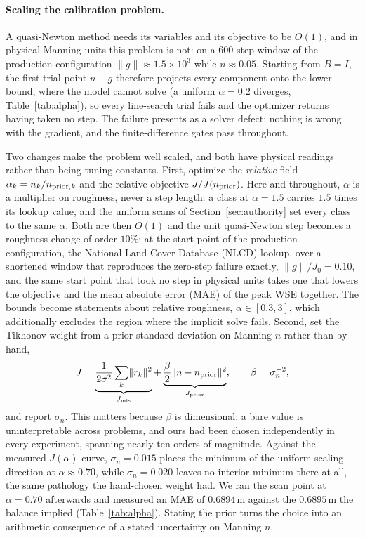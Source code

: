 \documentclass[11pt]{article}
\begin{document}
\paragraph{Scaling the calibration problem.}
A quasi-Newton method needs its variables and its objective to be
$O(1)$, and in physical Manning units this problem is not: on a
600-step window of the production configuration
$\lVert g\rVert \approx 1.5\times10^{3}$ while $n \approx 0.05$.
Starting from $B = I$, the first trial point $n - g$
therefore projects every component onto the lower bound, where the
model cannot solve (a uniform $\alpha = 0.2$ diverges,
Table~\ref{tab:alpha}), so every line-search trial fails and the
optimizer returns having taken no step. The failure presents as a
solver defect: nothing is wrong with the gradient, and the
finite-difference gates pass throughout.

Two changes make the problem well scaled, and both have physical
readings rather than being tuning constants. First, optimize the
\emph{relative} field $\alpha_k = n_k / n_{{\rm prior},k}$ and the
relative objective $J / J(n_{\rm prior})$. Here and throughout,
$\alpha$ is a multiplier on roughness, never a step length: a class
at $\alpha = 1.5$ carries $1.5$ times its lookup value, and the
uniform scans of Section~\ref{sec:authority} set every class to the
same $\alpha$. Both are then $O(1)$ and the
unit quasi-Newton step becomes a roughness change of order $10\%$: at
the start point of the production configuration, the National Land
Cover Database (NLCD) lookup, over a shortened window that reproduces
the zero-step failure exactly, $\lVert g\rVert / J_0 = 0.10$, and the
same start point that took no step in physical units takes one that
lowers the objective and the mean absolute error (MAE) of the peak WSE
together. The bounds become statements about relative
roughness,
$\alpha \in [0.3, 3]$, which additionally excludes the region where the
implicit solve fails. Second, set the Tikhonov weight from a prior
standard deviation on Manning $n$ rather than by hand,
\begin{equation}
J = \underbrace{\frac{1}{2\sigma^2}\sum_k \lVert r_k\rVert^2}_{
      J_{\mathrm{mis}}}
  + \underbrace{\frac{\beta}{2}\lVert n - n_{\rm prior}\rVert^2}_{
      J_{\rm prior}} ,
  \qquad \beta = \sigma_n^{-2},
\label{eq:sigman}
\end{equation}
and report $\sigma_n$. This matters because $\beta$ is dimensional: a
bare value is uninterpretable across problems, and ours had been chosen
independently in every experiment, spanning nearly ten orders of
magnitude.
Against the measured $J(\alpha)$ curve, $\sigma_n = 0.015$ places the
minimum of the uniform-scaling direction at $\alpha \approx 0.70$,
while $\sigma_n = 0.020$ leaves no interior minimum there at all, the
same pathology the hand-chosen weight had. We ran the scan point at
$\alpha = 0.70$ afterwards and measured an MAE of $0.6894$\,m against
the $0.6895$\,m the balance implied (Table~\ref{tab:alpha}). Stating
the prior turns the choice into an arithmetic consequence of a stated
uncertainty on Manning $n$.
\end{document}
